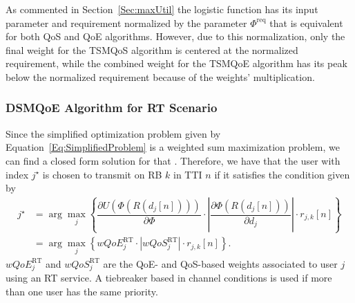 \documentclass[conference]{IEEEtran}
\newcommand{\FigRef}[1]{Figure~\ref{#1}}
\newcommand{\SecRef}[1]{Section~\ref{#1}}
\newcommand{\EqRef}[1]{Equation~\ref{#1}}
\begin{document}

As commented in \SecRef{Sec:maxUtil} the logistic function has its input parameter and requirement normalized by the parameter $\Phi^{\mathrm{req}}$ that is equivalent for both QoS and QoE algorithms. However, due to this normalization, only the final weight for the TSMQoS algorithm is centered at the normalized requirement, while the combined weight for the TSMQoE algorithm has its peak below the normalized requirement because of the weights' multiplication. 


\subsubsection{DSMQoE Algorithm for \ac{RT} Scenario}
Since the simplified optimization problem given by \EqRef{Eq:SimplifiedProblem} is a weighted sum maximization problem, we can find a closed form solution for that \cite{Art:Song2005_p2,Proc:Hosein2002}. Therefore, we have that the user with index $j^\star$ is chosen to transmit on \ac{RB} $k$ in \ac{TTI} $n$ if it satisfies the condition given by
%
\begin{equation}
\label{Eq:argmaxDSMQoE}
\begin{split}
j^{\star} &= \arg\max_{j} \left\{\dfrac{\partial U\left(\Phi\left(R\left(d_j[n]\right)\right)\right)}{\partial \Phi} \cdot \left| \dfrac{\partial \Phi\left(R\left(d_j[n]\right)\right)}{\partial {d_j}} \right| \cdot r_{j,k}\left[n\right]\right\}\\ &= \arg\max_{j} \left\{wQoE_{j}^{\text{RT}}\cdot |wQoS_{j}^{\text{RT}}| \cdot r_{j,k}\left[n\right]\right\}.
\end{split}
\end{equation}
%
$wQoE_{j}^{\text{RT}}$ and $wQoS_{j}^{\text{RT}}$ are the QoE- and QoS-based weights associated to user $j$ using an \ac{RT} service. A tiebreaker based in channel conditions is used if more than one user has the same priority.
\end{document}
